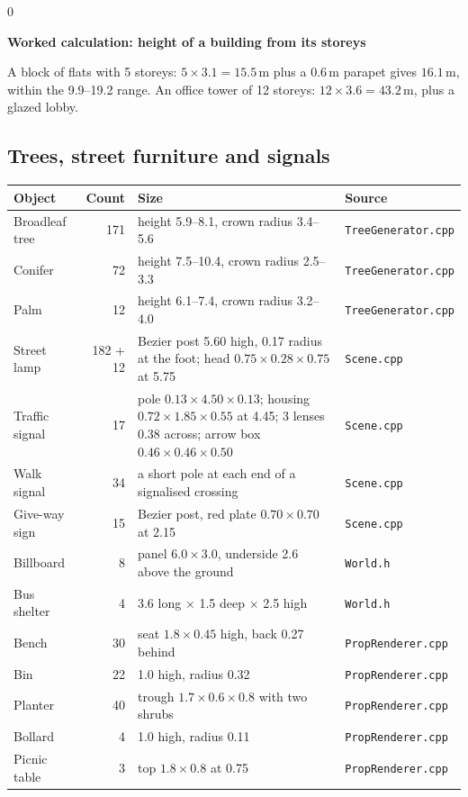 \documentclass[11pt,a4paper]{article}
\newcommand{\code}[1]{\texttt{\small #1}}
\newenvironment{calc}[1]{\par\smallskip\noindent\begin{minipage}{\textwidth}\setlength{\fboxsep}{6pt}\begin{lrbox}{0}\begin{minipage}{0.955\textwidth}\textbf{Worked calculation: #1}\par\smallskip}{\end{minipage}\end{lrbox}\fbox{\usebox{0}}\end{minipage}\par\smallskip}
\begin{document}
\begin{calc}{height of a building from its storeys}
A block of flats with 5 storeys: $5 \times 3.1 = 15.5$\,m plus a 0.6\,m parapet gives $16.1$\,m, within the 9.9--19.2 range. An office tower of 12 storeys: $12\times3.6 = 43.2$\,m, plus a glazed lobby.
\end{calc}

\subsection{Trees, street furniture and signals}
\begin{table}[H]
\centering\small
\begin{tabularx}{\textwidth}{@{}lr X l@{}}
\toprule
Object & Count & Size & Source \\ \midrule
Broadleaf tree & 171 & height 5.9--8.1, crown radius 3.4--5.6 & \code{TreeGenerator.cpp}\\
Conifer & 72 & height 7.5--10.4, crown radius 2.5--3.3 & \code{TreeGenerator.cpp}\\
Palm & 12 & height 6.1--7.4, crown radius 3.2--4.0 & \code{TreeGenerator.cpp}\\
Street lamp & 182 + 12 & Bezier post 5.60 high, 0.17 radius at the foot; head $0.75\times0.28\times0.75$ at 5.75 & \code{Scene.cpp}\\
Traffic signal & 17 & pole $0.13\times4.50\times0.13$; housing $0.72\times1.85\times0.55$ at 4.45; 3 lenses 0.38 across; arrow box $0.46\times0.46\times0.50$ & \code{Scene.cpp}\\
Walk signal & 34 & a short pole at each end of a signalised crossing & \code{Scene.cpp}\\
Give-way sign & 15 & Bezier post, red plate $0.70\times0.70$ at 2.15 & \code{Scene.cpp}\\
Billboard & 8 & panel $6.0\times3.0$, underside 2.6 above the ground & \code{World.h}\\
Bus shelter & 4 & $3.6$ long $\times$ 1.5 deep $\times$ 2.5 high & \code{World.h}\\
Bench & 30 & seat $1.8\times0.45$ high, back 0.27 behind & \code{PropRenderer.cpp}\\
Bin & 22 & 1.0 high, radius 0.32 & \code{PropRenderer.cpp}\\
Planter & 40 & trough $1.7\times0.6\times0.8$ with two shrubs & \code{PropRenderer.cpp}\\
Bollard & 4 & 1.0 high, radius 0.11 & \code{PropRenderer.cpp}\\
Picnic table & 3 & top $1.8\times0.8$ at 0.75 & \code{PropRenderer.cpp}\\

\end{tabularx}
\end{table}
\end{document}
